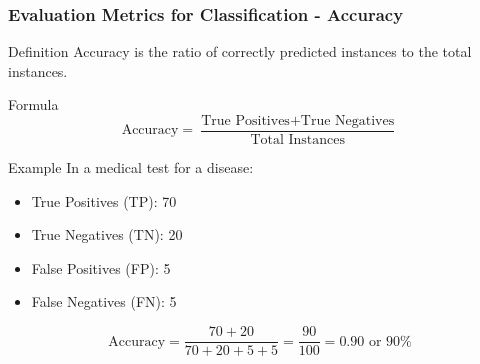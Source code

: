 \documentclass[aspectratio=169]{beamer}
\begin{document}
\begin{frame}[fragile]
    \frametitle{Evaluation Metrics for Classification - Accuracy}
    \begin{block}{Definition}
        Accuracy is the ratio of correctly predicted instances to the total instances.
    \end{block}
    
    \begin{block}{Formula}
        \begin{equation}
        \text{Accuracy} = \frac{\text{True Positives} + \text{True Negatives}}{\text{Total Instances}}
        \end{equation}
    \end{block}
    
    \begin{block}{Example}
        In a medical test for a disease:
        \begin{itemize}
            \item True Positives (TP): 70
            \item True Negatives (TN): 20
            \item False Positives (FP): 5
            \item False Negatives (FN): 5
        \end{itemize}
        \[
        \text{Accuracy} = \frac{70 + 20}{70 + 20 + 5 + 5} = \frac{90}{100} = 0.90 \text{ or } 90\%
        \]
    \end{block}
\end{frame}
\end{document}
